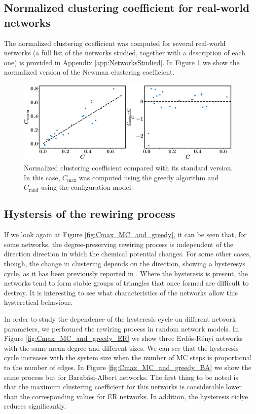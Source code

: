 \documentclass{article}
\begin{document}
\subsection{Normalized clustering coefficient for real-world networks}

The normalized clustering coefficient was computed for several real-world networks (a full list of the networks studied, together with a description of each one) is provided in Appendix \ref{app:NetworksStudied}. In Figure \ref{fig:Cnorm_vs_C} we show the normalized version of the Newman clustering coefficient.

\begin{figure}[ht!]
\centering
\includegraphics[scale=0.35]{./figs/Cnorm_vs_C}
\caption{Normalized clustering coefficient compared with its standard version. In this case, $C_{\mathrm{max}}$ was computed using the greedy algorithm and $C_{\mathrm{rand}}$ using the configuration model.}
\label{fig:Cnorm_vs_C}
\end{figure}

\subsection{Hystersis of the rewiring process}

If we look again at Figure \ref{fig:Cmax_MC_and_greedy}, it can be seen that, for some networks, the degree-preserving rewiring process is independent of the direction direction in which the chemical potential changes. For some other cases, though, the change in clustering depends on the direction, showing a hysteresys cycle, as it has been previously reported in \cite{Foster2010CommunitiesEnsembles}. Where the hysteresis is present, the networks tend to form stable groups of triangles that once formed are difficult to destroy. It is interesting to see what characteristics of the networks allow this hysteretical behaviour.

In order to study the dependence of the hysteresis cycle on different network parameters, we performed the rewiring process in random network models. In Figure \ref{fig:Cmax_MC_and_greedy_ER} we show three Erd\H{o}s-R\'enyi networks with the same mean degree and different sizes. We can see that the hysteresis cycle increases with the system size when the number of MC steps is proportional to the number of edges. In Figure \ref{fig:Cmax_MC_and_greedy_BA} we show the same process but for Barab\'asi-Albert networks. The first thing to be noted is that the maximum clustering coefficient for this networks is considerable lower than the corresponding values for ER networks. In addition, the hysteresis ciclye reduces significantly. 
\end{document}
